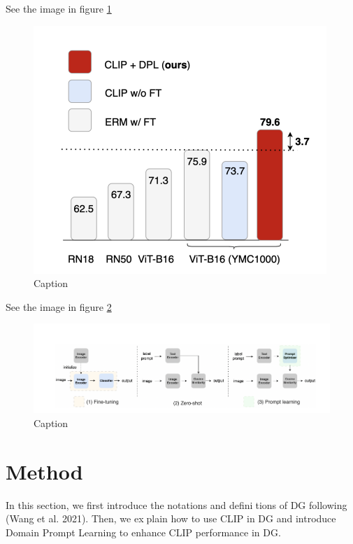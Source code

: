 \documentclass{article}
\begin{document}
See the image in figure \ref{fig:my_label1}
\begin{figure}
    \centering
    \includegraphics[width=0.95\linewidth]{figure1.jpg}
    \caption{Caption}
    \label{fig:my_label1}
\end{figure}

See the image in figure \ref{fig:my_label2}
\begin{figure}
    \centering
    \includegraphics[width=0.95\linewidth]{figure2.jpg}
    \caption{Caption}
    \label{fig:my_label2}
\end{figure}


\section{Method}

In this section, we first introduce the notations and definitions of DG following (Wang et al. 2021). Then, we explain how to use CLIP in DG and introduce Domain Prompt
Learning to enhance CLIP performance in DG.
\end{document}
